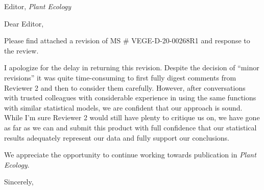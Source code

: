 \documentclass[parskip=half, 
			   fontsize=11pt,
			   paper=a4]				
{scrartcl}
\begin{document}
	\begin{letter}{Editor, \emph{Plant Ecology}}
\setlength{\parindent}{10pt}

\opening{Dear Editor,}  
		
Please find attached a revision of MS \# VEGE-D-20-00268R1 and response to the review. 

I apologize for the delay in returning this revision. 
Despite the decision of ``minor revisions'' it was quite time-consuming to first fully digest comments from Reviewer 2 and then to consider them carefully. 
However, after conversations with trusted colleagues with considerable experience in using the same functions with similar statistical models, we are confident that our approach is sound. 
While I'm sure Reviewer 2 would still have plenty to critique us on, we have gone as far as we can and submit this product with full confidence that our statistical results adequately represent our data and fully support our conclusions. 	

We appreciate the opportunity to continue working towards publication in \emph{Plant Ecology}. 
		
\closing{Sincerely,} %
\end{letter}
\end{document}
